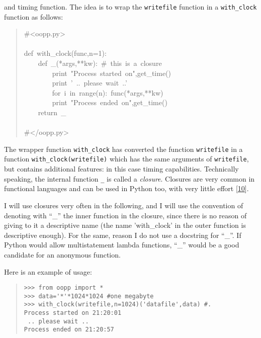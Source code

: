 \documentclass[10pt,english]{article}
\begin{document}
and timing function. The idea is to wrap the \texttt{writefile} function in
a \texttt{with{\_}clock} function as follows:
\begin{quote}
\begin{ttfamily}\begin{flushleft}
\mbox{{\#}<oopp.py>}\\
\mbox{}\\
\mbox{def~with{\_}clock(func,n=1):}\\
\mbox{~~~~def~{\_}(*args,**kw):~{\#}~this~is~a~closure}\\
\mbox{~~~~~~~~print~"Process~started~on",get{\_}time()}\\
\mbox{~~~~~~~~print~'~..~please~wait~..'}\\
\mbox{~~~~~~~~for~i~in~range(n):~func(*args,**kw)}\\
\mbox{~~~~~~~~print~"Process~ended~on",get{\_}time()}\\
\mbox{~~~~return~{\_}}\\
\mbox{}\\
\mbox{{\#}</oopp.py>}
\end{flushleft}\end{ttfamily}
\end{quote}

The wrapper function \texttt{with{\_}clock} has converted the function \texttt{writefile} 
in a function \texttt{with{\_}clock(writefile)} which has the same arguments
of \texttt{writefile}, but contains additional features: in this case
timing capabilities. Technically speaking, the internal function \texttt{{\_}}
is called a \emph{closure}. Closures are very common in functional languages 
and can be used in Python too, with very little effort [\hyperlink{id21}{10}].

I will use closures very often in the following, and I will use
the convention of denoting with ``{\_}'' the inner 
function in the closure, since there is no reason of giving to it a 
descriptive name (the name 'with{\_}clock' in the outer function 
is descriptive enough). For the same, reason I do not use a 
docstring for ``{\_}''. If Python would allow multistatement lambda
functions, ``{\_}'' would be a good candidate for an anonymous function.

Here is an example of usage:
\begin{quote}
\begin{verbatim}>>> from oopp import *
>>> data='*'*1024*1024 #one megabyte
>>> with_clock(writefile,n=1024)('datafile',data) #.
Process started on 21:20:01
 .. please wait ..
Process ended on 21:20:57\end{verbatim}
\end{quote}
\end{document}
